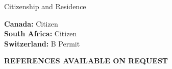 \documentclass{cv}
\begin{document}
\vspace{-0.4em}

\begin{rSection}{Citizenship and Residence}

{\bf Canada:} Citizen \vspace{0.2em}\\
{\bf South Africa:} Citizen \vspace{0.2em}\\
{\bf Switzerland:} B Permit

\end{rSection}


\vspace{1em}
\begin{center}
    \large{\MakeUppercase{\bf References Available On Request}}
\end{center}
\end{document}
